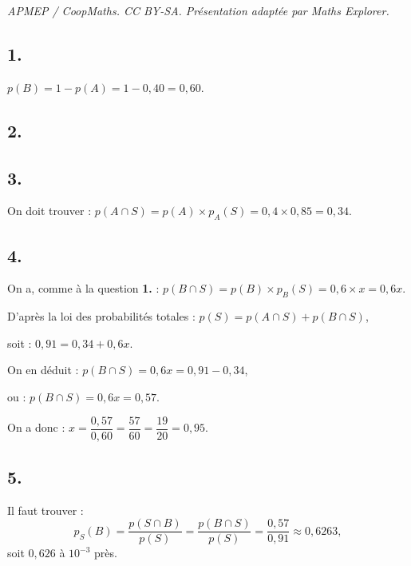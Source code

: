 \documentclass[10pt]{article}
\begin{document}
\noindent\textit{APMEP / CoopMaths. CC BY-SA. Présentation adaptée par Maths Explorer.}\par\medskip
\subsection*{1.}

\(p(B) = 1 - p(A) = 1 - 0{,}40 = 0{,}60\).

\subsection*{2.}

\begin{center}
\end{center}

\subsection*{3.}

On doit trouver : \(p(A \cap S) = p(A) \times p_A(S) = 0{,}4 \times 0{,}85 = 0{,}34\).

\subsection*{4.}

On a, comme à la question \textbf{1.} : \(p(B \cap S) = p(B) \times p_B(S) = 0{,}6 \times x = 0{,}6x\).

D'après la loi des probabilités totales : \(p(S) = p(A \cap S) + p(B \cap S)\),

soit : \(0{,}91 = 0{,}34 + 0{,}6x\).

On en déduit : \(p(B \cap S) = 0{,}6x = 0{,}91 - 0{,}34\),

ou : \(p(B \cap S) = 0{,}6x = 0{,}57\).

On a donc : \(x = \dfrac{0{,}57}{0{,}60} = \dfrac{57}{60} = \dfrac{19}{20} = 0{,}95\).

\subsection*{5.}

Il faut trouver :
\[
p_S(B) = \dfrac{p(S \cap B)}{p(S)} = \dfrac{p(B \cap S)}{p(S)} = \dfrac{0{,}57}{0{},91} \approx 0{,}6263,
\]
soit \(0{,}626\) à \(10^{-3}\) près.
\end{document}
